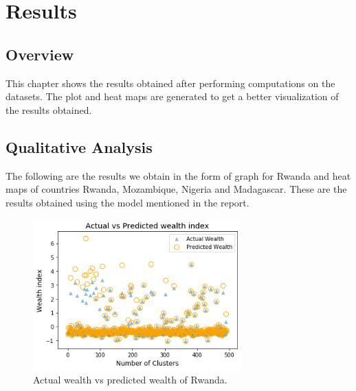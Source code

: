 \chapter{Results}

\section{Overview}
This chapter shows the results obtained after performing computations on the datasets. The plot and heat maps are generated to get a better visualization of the results obtained.

\section{Qualitative Analysis}
The following are the results we obtain in the form of graph for Rwanda and heat maps of countries Rwanda, Mozambique, Nigeria and Madagascar. These are the results obtained using the model mentioned in the report.


\begin{figure}[h!]
\centering
  \includegraphics[width=8cm]{setup/img/actvspredwlth.png}
  \newline
  \caption{Actual wealth vs predicted wealth of Rwanda.}
  \label{fig3}
  \centering
\end{figure}




